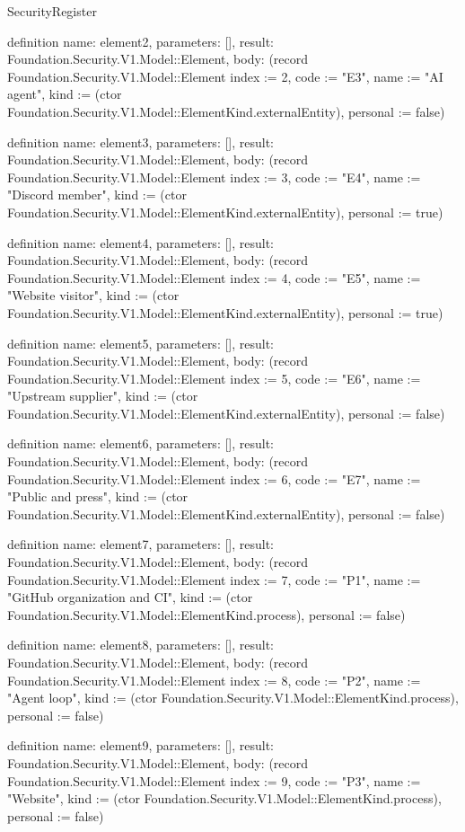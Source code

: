 \begin{lexlean}{SecurityRegister}
\begin{semanticmodule}
definition{
  name: element2,
  parameters: [],
  result: Foundation.Security.V1.Model::Element,
  body: (record Foundation.Security.V1.Model::Element {index := 2, code := "E3", name := "AI agent", kind := (ctor Foundation.Security.V1.Model::ElementKind.externalEntity), personal := false})
}

definition{
  name: element3,
  parameters: [],
  result: Foundation.Security.V1.Model::Element,
  body: (record Foundation.Security.V1.Model::Element {index := 3, code := "E4", name := "Discord member", kind := (ctor Foundation.Security.V1.Model::ElementKind.externalEntity), personal := true})
}

definition{
  name: element4,
  parameters: [],
  result: Foundation.Security.V1.Model::Element,
  body: (record Foundation.Security.V1.Model::Element {index := 4, code := "E5", name := "Website visitor", kind := (ctor Foundation.Security.V1.Model::ElementKind.externalEntity), personal := true})
}

definition{
  name: element5,
  parameters: [],
  result: Foundation.Security.V1.Model::Element,
  body: (record Foundation.Security.V1.Model::Element {index := 5, code := "E6", name := "Upstream supplier", kind := (ctor Foundation.Security.V1.Model::ElementKind.externalEntity), personal := false})
}

definition{
  name: element6,
  parameters: [],
  result: Foundation.Security.V1.Model::Element,
  body: (record Foundation.Security.V1.Model::Element {index := 6, code := "E7", name := "Public and press", kind := (ctor Foundation.Security.V1.Model::ElementKind.externalEntity), personal := false})
}

definition{
  name: element7,
  parameters: [],
  result: Foundation.Security.V1.Model::Element,
  body: (record Foundation.Security.V1.Model::Element {index := 7, code := "P1", name := "GitHub organization and CI", kind := (ctor Foundation.Security.V1.Model::ElementKind.process), personal := false})
}

definition{
  name: element8,
  parameters: [],
  result: Foundation.Security.V1.Model::Element,
  body: (record Foundation.Security.V1.Model::Element {index := 8, code := "P2", name := "Agent loop", kind := (ctor Foundation.Security.V1.Model::ElementKind.process), personal := false})
}

definition{
  name: element9,
  parameters: [],
  result: Foundation.Security.V1.Model::Element,
  body: (record Foundation.Security.V1.Model::Element {index := 9, code := "P3", name := "Website", kind := (ctor Foundation.Security.V1.Model::ElementKind.process), personal := false})
}


\end{semanticmodule}
\end{lexlean}
